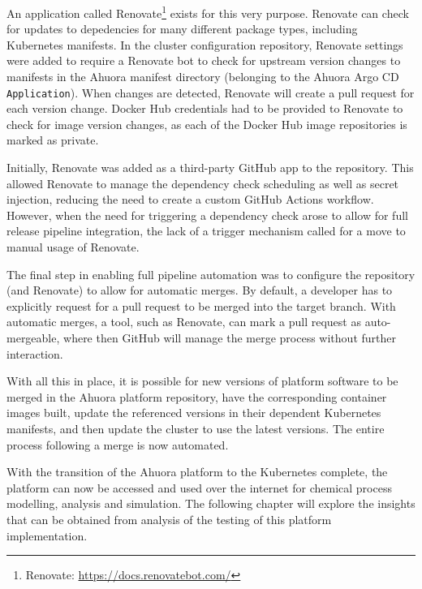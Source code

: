 An application called Renovate\footnote{Renovate: \url{https://docs.renovatebot.com/}} exists for this very purpose. Renovate can check for updates to depedencies for many different package types, including Kubernetes manifests. In the cluster configuration repository, Renovate settings were added to require a Renovate bot to check for upstream version changes to manifests in the Ahuora manifest directory (belonging to the Ahuora Argo CD \verb|Application|). When changes are detected, Renovate will create a pull request  for each version change. Docker Hub credentials had to be provided to Renovate to check for image version changes, as each of the Docker Hub image repositories is marked as private.

Initially, Renovate was added as a third-party GitHub app to the repository. This allowed Renovate to manage the dependency check scheduling as well as secret injection, reducing the need to create a custom GitHub Actions workflow. However, when the need for triggering a dependency check arose to allow for full release pipeline integration, the lack of a trigger mechanism called for a move to manual usage of Renovate.

The final step in enabling full pipeline automation was to configure the repository (and Renovate) to allow for automatic merges. By default, a developer has to explicitly request for a pull request to be merged into the target branch. With automatic merges, a tool, such as Renovate, can mark a pull request as auto-mergeable, where then GitHub will manage the merge process without further interaction.

With all this in place, it is possible for new versions of platform software to be merged in the Ahuora platform repository, have the corresponding container images built, update the referenced versions in their dependent Kubernetes manifests, and then update the cluster to use the latest versions. The entire process following a merge is now automated.

\vspace{1cm}

\noindent With the transition of the Ahuora platform to the Kubernetes complete, the platform can now be accessed and used over the internet for chemical process modelling, analysis and simulation. The following chapter will explore the insights that can be obtained from analysis of the testing of this platform implementation.

